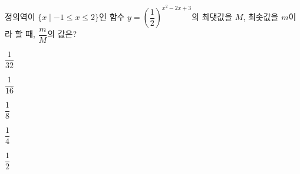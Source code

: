 정의역이 $\{x\mid -1\le x\le 2\}$인 함수 $y=\left(\dfrac{1}{2}\right)^{x^2-2x+3}$의 최댓값을 $M$, 최솟값을 $m$이라 할 때, $\dfrac{m}{M}$의 값은?
\begin{choices32}{\rule[-3ex]{0pt}{8ex}$\dfrac{1}{32}$}{\rule[-3ex]{0pt}{8ex}$\dfrac{1}{16}$}{\rule[-3ex]{0pt}{8ex}$\dfrac{1}{8}$}{\rule[-3ex]{0pt}{8ex}$\dfrac{1}{4}$}{\rule[-3ex]{0pt}{8ex}$\dfrac{1}{2}$}\end{choices32}
